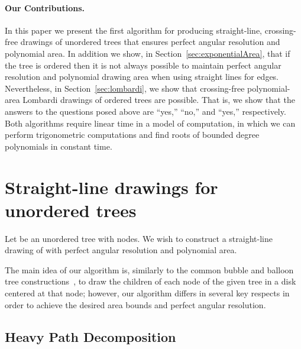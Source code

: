 \documentclass[11pt]{article}
\begin{document}
\paragraph{Our Contributions.} 
In this paper we present the first algorithm for producing
straight-line, crossing-free 
drawings of unordered trees that ensures perfect angular resolution and 
polynomial area. 
In addition we show, in Section~\ref{sec:exponentialArea},
that if the tree is ordered then it 
is not always possible to maintain perfect angular 
resolution and polynomial drawing area
when using straight lines for edges.
Nevertheless,
in Section~\ref{sec:lombardi}, we show that crossing-free polynomial-area
Lombardi drawings of ordered trees are possible.
That is, we show that
the answers to the questions posed above are ``yes,'' ``no,''
and ``yes,'' respectively.
Both algorithms require linear time in a model of computation, in which we can perform trigonometric computations and find roots of bounded degree polynomials in constant time. 


\section{Straight-line drawings for unordered trees}\label{sec:straight-line-tree}
\label{sec:straightLine}

Let  be an unordered tree with  nodes.  We wish to construct a
straight-line drawing of  with perfect angular resolution and
polynomial area.

The main idea of our algorithm is, similarly to the common bubble and
balloon tree constructions~\cite{ga-bt-04,ly-bdrt-07}, to draw the
children of each node of the given tree in a disk centered at that
node; however, our algorithm differs in several key respects in order
to achieve the desired area bounds and perfect angular resolution.

\subsection{Heavy Path Decomposition}\label{sec:hpd}
\end{document}
